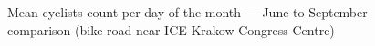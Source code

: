 \begin{figure}[H]
    \centering
    \caption{Mean cyclists count per day of the month --- June to September comparison (bike road near ICE Krakow Congress Centre)}
    \label{fig:graph9}
\end{figure}

